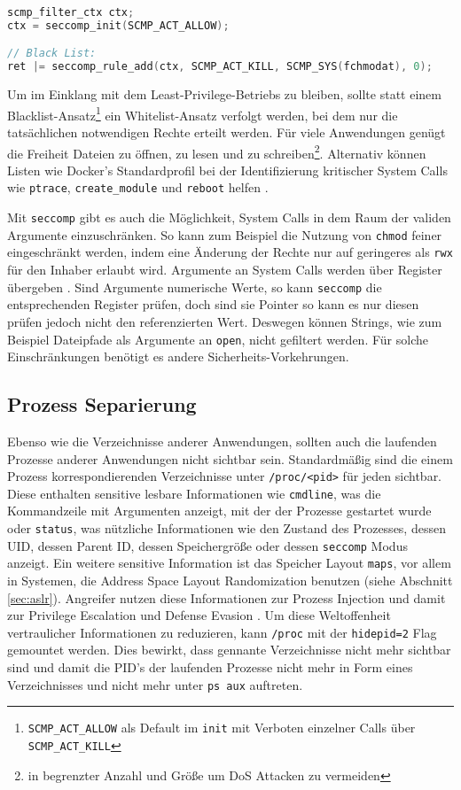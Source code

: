 \begin{lstlisting}[language=c]
scmp_filter_ctx ctx;
ctx = seccomp_init(SCMP_ACT_ALLOW);

// Black List:
ret |= seccomp_rule_add(ctx, SCMP_ACT_KILL, SCMP_SYS(fchmodat), 0); 
\end{lstlisting}

Um im Einklang mit dem Least-Privilege-Betriebs zu bleiben, sollte statt einem Blacklist-Ansatz\footnote{\texttt{SCMP\_ACT\_ALLOW} als Default im \texttt{init} mit Verboten einzelner Calls über \texttt{SCMP\_ACT\_KILL}} ein Whitelist-Ansatz verfolgt werden, bei dem nur die tatsächlichen notwendigen Rechte erteilt werden. Für viele Anwendungen genügt die Freiheit Dateien zu öffnen, zu lesen und zu schreiben\footnote{in begrenzter Anzahl und Größe um DoS Attacken zu vermeiden}.
Alternativ können Listen wie Docker's Standardprofil bei der Identifizierung kritischer System Calls wie \texttt{ptrace}, \texttt{create\_module} und \texttt{reboot} helfen \cite{docker-seccomp}. 

Mit \texttt{seccomp} gibt es auch die Möglichkeit, System Calls in dem Raum der validen Argumente einzuschränken. So kann zum Beispiel die Nutzung von \texttt{chmod} feiner eingeschränkt werden, indem eine Änderung der Rechte nur auf geringeres als \texttt{rwx} für den Inhaber erlaubt wird. Argumente an System Calls werden über Register übergeben \cite{man-syscall}. Sind Argumente numerische Werte, so kann \texttt{seccomp} die entsprechenden Register prüfen,
doch sind sie Pointer so kann es nur diesen prüfen jedoch nicht den referenzierten Wert. Deswegen können Strings, wie zum Beispiel Dateipfade als Argumente an \texttt{open}, nicht gefiltert werden. Für solche Einschränkungen benötigt es andere Sicherheits-Vorkehrungen.

\subsection{Prozess Separierung}

Ebenso wie die Verzeichnisse anderer Anwendungen, sollten auch die laufenden Prozesse anderer Anwendungen nicht sichtbar sein. Standardmäßig sind die einem Prozess korrespondierenden Verzeichnisse unter \texttt{/proc/<pid>} für jeden sichtbar. Diese enthalten sensitive lesbare Informationen wie \texttt{cmdline}, was die Kommandzeile mit Argumenten anzeigt, mit der der Prozesse gestartet wurde oder \texttt{status}, was nützliche Informationen wie den Zustand des Prozesses, dessen
UID, dessen Parent ID, dessen Speichergröße oder dessen \texttt{seccomp} Modus anzeigt. Ein weitere sensitive Information ist das Speicher Layout \texttt{maps}, vor allem in Systemen, die Address Space Layout Randomization benutzen (siehe Abschnitt \ref{sec:aslr}).
Angreifer nutzen diese Informationen zur Prozess Injection und damit zur Privilege Escalation und Defense Evasion \cite{attack-process-injection}.
Um diese Weltoffenheit vertraulicher Informationen zu reduzieren, kann \texttt{/proc} mit der \texttt{hidepid=2} Flag gemountet werden. Dies bewirkt, dass gennante Verzeichnisse nicht mehr sichtbar sind und damit die PID's der laufenden Prozesse nicht mehr in Form eines Verzeichnisses und nicht mehr unter \texttt{ps aux} auftreten. 

